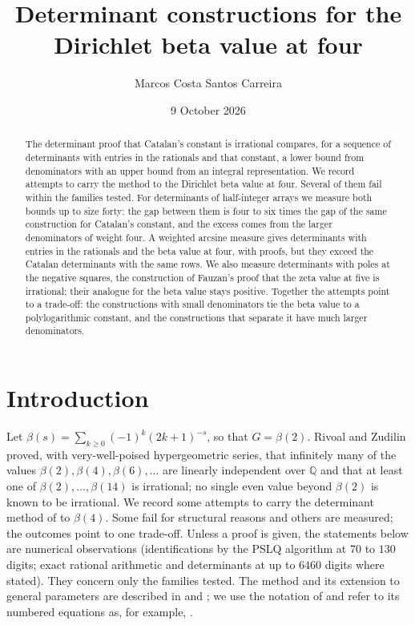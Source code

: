 \documentclass[11pt]{article}
\title{Determinant constructions for the Dirichlet beta value at four}
\author{Marcos Costa Santos Carreira}
\date{9 October 2026}
\theoremstyle{definition}
\begin{document}
\maketitle

\begin{abstract}
The determinant proof that Catalan's constant is irrational compares, for a sequence of determinants with entries in the rationals and that constant, a lower bound from denominators with an upper bound from an integral representation. We record attempts to carry the method to the Dirichlet beta value at four. Several of them fail within the families tested. For determinants of half-integer arrays we measure both bounds up to size forty: the gap between them is four to six times the gap of the same construction for Catalan's constant, and the excess comes from the larger denominators of weight four. A weighted arcsine measure gives determinants with entries in the rationals and the beta value at four, with proofs, but they exceed the Catalan determinants with the same rows. We also measure determinants with poles at the negative squares, the construction of Fauzan's proof that the zeta value at five is irrational; their analogue for the beta value stays positive. Together the attempts point to a trade-off: the constructions with small denominators tie the beta value to a polylogarithmic constant, and the constructions that separate it have much larger denominators.
\end{abstract}

\section{Introduction}\label{sec:intro}

Let $\beta(s)=\sum_{k\ge0}(-1)^k(2k+1)^{-s}$, so that $G=\beta(2)$. Rivoal and Zudilin \cite{RZ} proved, with very-well-poised hypergeometric series, that infinitely many of the values $\beta(2),\beta(4),\beta(6),\dots$ are linearly independent over $\mathbb Q$ and that at least one of $\beta(2),\dots,\beta(14)$ is irrational; no single even value beyond $\beta(2)$ is known to be irrational. We record some attempts to carry the determinant method of \cite{OAI} to $\beta(4)$. Some fail for structural reasons and others are measured; the outcomes point to one trade-off. Unless a proof is given, the statements below are numerical observations (identifications by the PSLQ algorithm at $70$ to $130$ digits; exact rational arithmetic and determinants at up to $6460$ digits where stated). They concern only the families tested. The method and its extension to general parameters are described in \cite{OAI} and \cite{MCSC2}; we use the notation of \cite{OAI} and refer to its numbered equations as, for example, \cite[Eq.~(6)]{OAI}.
\end{document}
